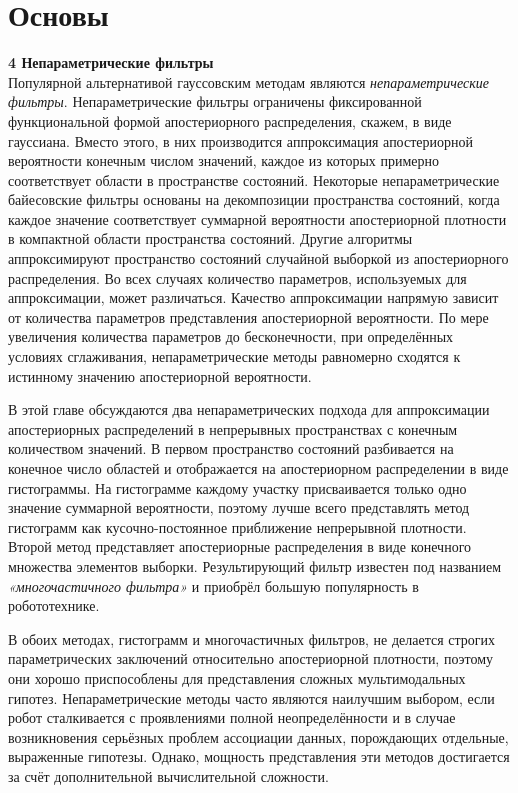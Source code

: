 \documentclass[10pt,a4paper]{article}
\begin{document}
\part{Основы}



\textbf{4 Непараметрические фильтры}\\

Популярной альтернативой гауссовским методам являются \textit{непараметрические фильтры}. Непараметрические фильтры ограничены фиксированной функциональной формой апостериорного распределения, скажем, в виде гауссиана. Вместо этого, в них производится аппроксимация апостериорной вероятности конечным числом значений, каждое из которых примерно соответствует области в пространстве состояний. Некоторые непараметрические байесовские фильтры основаны на декомпозиции пространства состояний, когда каждое значение соответствует суммарной вероятности апостериорной плотности в компактной области пространства состояний. Другие алгоритмы аппроксимируют пространство состояний случайной выборкой из апостериорного распределения. Во всех случаях количество параметров, используемых для аппроксимации, может различаться. Качество аппроксимации напрямую зависит от количества параметров представления апостериорной вероятности. По мере увеличения количества параметров до бесконечности, при определённых условиях сглаживания, непараметрические методы равномерно сходятся к истинному значению апостериорной вероятности.

В этой главе обсуждаются два непараметрических подхода для аппроксимации апостериорных распределений в непрерывных пространствах с конечным количеством значений. В первом пространство состояний разбивается на конечное число областей и отображается на апостериорном распределении в виде гистограммы. На гистограмме каждому участку присваивается только одно значение суммарной вероятности, поэтому лучше всего представлять метод гистограмм как кусочно-постоянное приближение непрерывной плотности. Второй метод представляет апостериорные распределения в виде конечного множества элементов выборки. Результирующий фильтр известен под названием \textit{«многочастичного фильтра»} и приобрёл большую популярность в робототехнике. 

В обоих методах, гистограмм и многочастичных фильтров, не делается строгих параметрических заключений относительно апостериорной плотности, поэтому они хорошо приспособлены для представления сложных мультимодальных гипотез. Непараметрические методы часто являются наилучшим выбором, если робот сталкивается с проявлениями полной неопределённости и в случае возникновения серьёзных проблем ассоциации данных, порождающих отдельные, выраженные гипотезы. Однако, мощность представления эти методов достигается за счёт дополнительной вычислительной сложности. 
\end{document}
